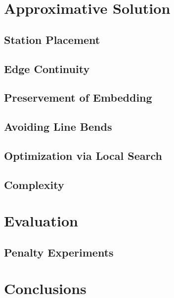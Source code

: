 \documentclass{sig-alternate-sigmod09}
\begin{document}
\section{Approximative Solution}

\subsection{Station Placement}

\subsection{Edge Continuity}

\subsection{Preservement of Embedding}

\subsection{Avoiding Line Bends}

\subsection{Optimization via Local Search}

\subsection{Complexity}

\section{Evaluation}

\subsection{Penalty Experiments}

\section{Conclusions}


\balancecolumns
\end{document}
